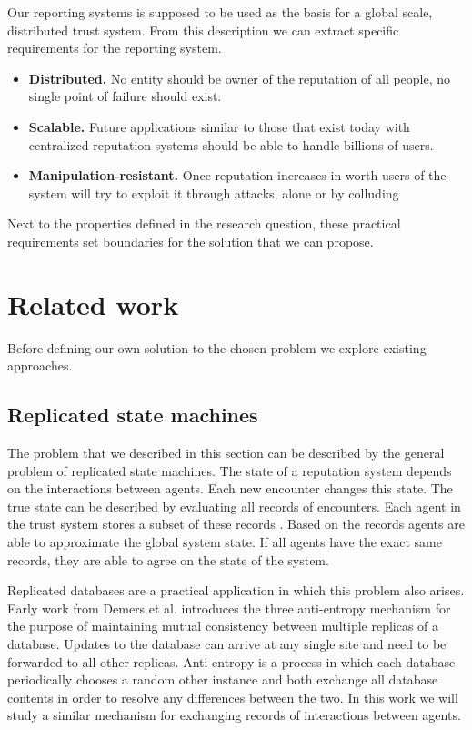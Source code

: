 Our reporting systems is supposed to be used as the basis for a global scale, distributed trust system. 
From this description we can extract specific requirements for the reporting system.


\begin{itemize}
    \item \textbf{Distributed.} No entity should be owner of the reputation of all people, no single point of
    failure should exist.
    \item \textbf{Scalable.} Future applications similar to those that exist today with centralized reputation
    systems should be able to handle billions of users.
    \item \textbf{Manipulation-resistant.} Once reputation increases in worth users of the 
    system will try to exploit it through attacks, alone or by colluding
\end{itemize}

Next to the properties defined in the research question, these practical requirements set boundaries
for the solution that we can propose.

\section{Related work}
\label{sec:related_work}
Before defining our own solution to the chosen problem we explore existing approaches.

\subsection{Replicated state machines}
The problem that we described in this section can be described by the general problem of replicated 
state machines. The state of a reputation system depends on the interactions between agents. Each 
new encounter changes this state. The true state can be described by evaluating all records of 
encounters. Each agent in the trust system stores a subset of these records . Based on the records
agents are able to approximate the global system state. If all agents have the exact same records, 
they are able to agree on the state of the system. 

Replicated databases are a practical application in which this problem also arises. Early work from
Demers et al.\cite{demers1987epidemic} introduces the three anti-entropy mechanism
for the purpose of maintaining mutual consistency between multiple replicas of a database. Updates
to the database can arrive at any single site and need to be forwarded to all other replicas. 
Anti-entropy is a process in which each database periodically 
chooses a random other instance and both exchange all database contents in order to resolve any 
differences between the two. In this work we will study a similar mechanism for exchanging records
of interactions between agents. 

